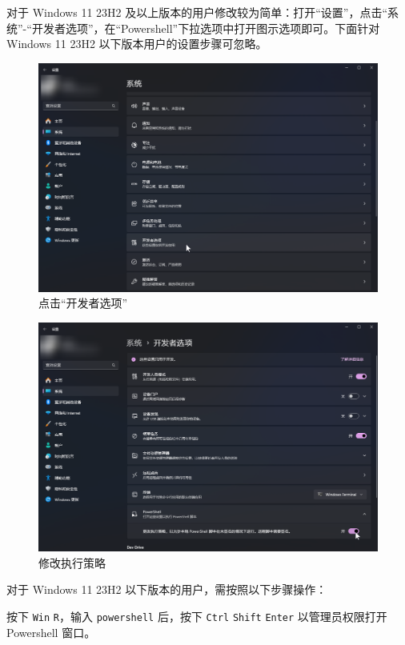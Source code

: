 对于 Windows 11 23H2 及以上版本的用户修改较为简单：打开“设置”，点击“系统”-“开发者选项”，在“Powershell”下拉选项中打开图示选项即可。下面针对 Windows 11 23H2 以下版本用户的设置步骤可忽略。

\begin{figure}[H]
    \Centering
    \includegraphics[width=\textwidth]{docs/assets/win11_23h2_00.png}
    \caption{点击“开发者选项”}
\end{figure}

\begin{figure}[H]
    \Centering
    \includegraphics[width=\textwidth]{docs/assets/win11_23h2_01.png}
    \caption{修改执行策略}
\end{figure}

对于 Windows 11 23H2 以下版本的用户，需按照以下步骤操作：

按下 \lstinline{Win} \lstinline{R}，输入 \lstinline{powershell} 后，按下 \lstinline{Ctrl} \lstinline{Shift} \lstinline{Enter} 以管理员权限打开 Powershell 窗口。

